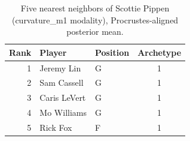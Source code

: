 \begin{table}[htbp]
  \centering\small
  \begin{tabular}{rllc}
    \toprule
    Rank & Player & Position & Archetype \\
    \midrule
    1 & Jeremy Lin & G & 1 \\
    2 & Sam Cassell & G & 1 \\
    3 & Caris LeVert & G & 1 \\
    4 & Mo Williams & G & 1 \\
    5 & Rick Fox & F & 1 \\
    \bottomrule
  \end{tabular}
  \caption{Five nearest neighbors of Scottie Pippen (curvature_m1 modality), Procrustes-aligned posterior mean.}
  \label{tab:Scottie_Pippen_neighbors_curvature_m1}
\end{table}

